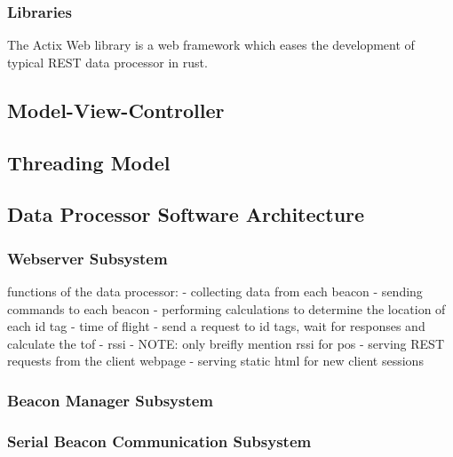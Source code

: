 \subsubsection{Libraries}
The Actix Web library is a web framework which eases the development of typical REST data processor in rust.


\subsection{Model-View-Controller}

\subsection{Threading Model}

\subsection{Data Processor Software Architecture}
\subsubsection{Webserver Subsystem}
functions of the data processor:
	- collecting data from each beacon
	- sending commands to each beacon
	- performing calculations to determine the location of each id tag
		- time of flight
			- send a request to id tags, wait for responses and calculate the tof
		- rssi
			- NOTE: only breifly mention rssi for pos
	- serving REST requests from the client webpage
	- serving static html for new client sessions

\subsubsection{Beacon Manager Subsystem}

\subsubsection{Serial Beacon Communication Subsystem}

